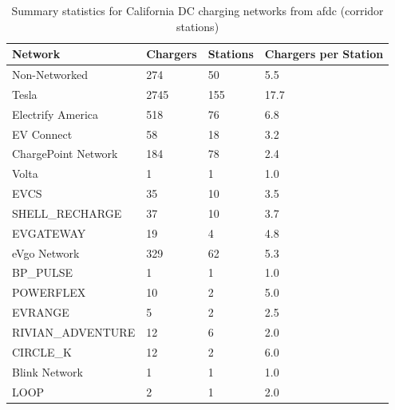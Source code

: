 \documentclass[11pt]{article}
\begin{document}
\begin{multicols}{2}
\begin{table}[H]
	\centering
	\caption{Summary statistics for California DC charging networks from \gls{afdc} (corridor stations)}
	\label{tab:summary_statistics_afdc_corridor}
	\begin{tabular}{|C{.46\linewidth}|C{.18\linewidth}|C{.18\linewidth}|C{.18\linewidth}|}
		\hline Network & Chargers & Stations & Chargers per Station \\
		\hline Non-Networked & 274 & 50 & 5.5 \\
		\hline Tesla & 2745 & 155 & 17.7 \\
		\hline Electrify America & 518 & 76 & 6.8 \\
		\hline EV Connect & 58 & 18 & 3.2 \\
		\hline ChargePoint Network & 184 & 78 & 2.4 \\
		\hline Volta & 1 & 1 & 1.0 \\
		\hline EVCS & 35 & 10 & 3.5 \\
		\hline SHELL_RECHARGE & 37 & 10 & 3.7 \\
		\hline EVGATEWAY & 19 & 4 & 4.8 \\
		\hline eVgo Network & 329 & 62 & 5.3 \\
		\hline BP_PULSE & 1 & 1 & 1.0 \\
		\hline POWERFLEX & 10 & 2 & 5.0 \\
		\hline EVRANGE & 5 & 2 & 2.5 \\
		\hline RIVIAN_ADVENTURE & 12 & 6 & 2.0 \\
		\hline CIRCLE_K & 12 & 2 & 6.0 \\
		\hline Blink Network & 1 & 1 & 1.0 \\
		\hline LOOP & 2 & 1 & 2.0 \\
		\hline
	\end{tabular}
\end{table}

%
%

\end{multicols}
\end{document}
